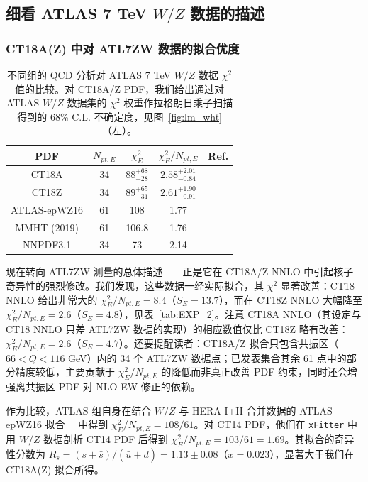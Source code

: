 \subsection{细看 ATLAS 7 TeV $W/Z$ 数据的描述}
\label{sec:CT18Z_qual}


\subsubsection{CT18A(Z) 中对 ATL7ZW 数据的拟合优度}
\label{sec:ATL7ZWchi2}

\begin{table}[tb]
\caption{不同组的 QCD 分析对 ATLAS 7 TeV $W/Z$ 数据 $\chi^{2}$ 值的比较。对 CT18A/Z PDF，我们给出通过对 ATLAS $W/Z$ 数据集的 $\chi^2$ 权重作拉格朗日乘子扫描得到的 68\% C.L. 不确定度，见图~\ref{fig:lm_wht}（左）。}
\label{tab:CMN}
\begin{tabular}{c|c|c|c|c}
\hline\hline
PDF & $N_{\mathit{pt, E}}$ & $\chi^{2}_E$ & $\chi^{2}_E/N_{\mathit{pt}, E}$ & Ref. \\
\hline
CT18A &  34  & $88^{+68}_{-28}$  & $2.58^{+2.01}_{-0.84}$ & \\
CT18Z & 34 & $89^{+65}_{-31}$ & $2.61^{+1.90}_{-0.91}$  & \\
\hline
ATLAS-epWZ16 &  61 & 108    & 1.77 & \cite{Aaboud:2016btc}\\
MMHT (2019)  &  61 & 106.8  & 1.76 &  \cite{Thorne:2019mpt}\\
NNPDF3.1     &  34 & 73     & 2.14 & \cite{Ball:2017nwa} \\
\hline\hline
\end{tabular}
\end{table}

现在转向 ATL7ZW 测量的总体描述——正是它在 CT18A/Z NNLO 中引起核子奇异性的强烈修改。我们发现，这些数据一经实际拟合，其 $\chi^2$ 显著改善：CT18 NNLO 给出非常大的 $\chi^2_E/N_\mathit{pt,E}\!=\! 8.4$（$S_E\! =\! 13.7$），而在 CT18Z NNLO 大幅降至 $\chi^2_E/N_\mathit{pt,E}\!=\! 2.6$（$S_E\! =\! 4.8$），见表~\ref{tab:EXP_2}。注意 CT18A NNLO（其设定与 CT18 NNLO 只差 ATL7ZW 数据的实现）的相应数值仅比 CT18Z 略有改善：$\chi^2_E/N_\mathit{pt,E}\!=\! 2.6$（$S_E\! =\! 4.7$）。还要提醒读者：CT18A/Z 拟合只包含共振区（$66 < Q < 116$ GeV）内的 34 个 ATL7ZW 数据点；已发表集合其余 61 点中的部分精度较低，主要贡献于 $\chi^2_E/N_{pt,E}$ 的降低而非真正改善 PDF 约束，同时还会增强离共振区 PDF 对 NLO EW 修正的依赖。

作为比较，ATLAS 组自身在结合 $W/Z$ 与 HERA I+II 合并数据的 ATLAS-epWZ16 拟合~\cite{Aaboud:2016btc}~\cite{Abramowicz:2015mha} 中得到 $\chi^2_E/N_{\mathit{pt,E}}=108/61$。对 CT14 PDF，他们在 \texttt{xFitter} 中用 $W/Z$ 数据剖析 CT14 PDF 后得到 $\chi^2_E/N_{\mathit{pt,E}}=103/61=1.69$。其拟合的奇异性分数为
$R_s=(s+\bar{s})/(\bar{u}+\bar{d})=1.13\pm0.08$（$x=0.023$），显著大于我们在 CT18A(Z) 拟合所得。

